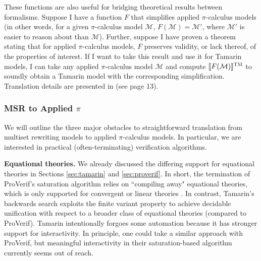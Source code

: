 \documentclass{article}
\theoremstyle{definition}
\begin{document}
These functions are also useful for bridging theoretical results between formalisms. 
Suppose I have a function $F$ that simplifies applied $\pi$-calculus models 
(in other words, for a given $\pi$-calculus model $\mathcal{M}$, $F(\mathcal{M}) = \mathcal{M}'$, 
where $\mathcal{M}'$ is easier to reason about than $\mathcal{M}$). 
Further, suppose I have proven a theorem stating that for applied $\pi$-calculus models, 
$F$ preserves validity, or lack thereof, of the properties of interest. 
If I want to take this result and use it for Tamarin models, 
I can take any applied $\pi$-calculus model $\mathcal{M}$ and 
compute $\llbracket F(\mathcal{M}) \rrbracket^{\textsc{TM}}$ 
to soundly obtain a Tamarin model with the corresponding simplification.
Translation details are presented in \cite{sapic_translation} (see page 13).

\subsubsection{MSR to Applied $\pi$} We will outline the three major obstacles to straightforward translation 
from multiset rewriting models to applied $\pi$-calculus models. 
In particular, we are interested in practical (often-terminating) verification algorithms.

\textbf{Equational theories.} We already discussed the differing support for equational theories in 
Sections \ref{sec:tamarin} and \ref{sec:proverif}. In short, the termination of ProVerif's saturation algorithm relies on 
``compiling away" equational theories, which is only supported for convergent or linear theories \cite{proverif_equations}. 
In contrast, Tamarin's backwards search exploits the finite variant property 
to achieve decidable unification with respect to a broader class of equational theories (compared to ProVerif). 
Tamarin intentionally forgoes some automation because it has stronger support for interactivity. 
In principle, one could take a similar approach with ProVerif, 
but meaningful interactivity in their saturation-based algorithm currently seems out of reach.
\end{document}
